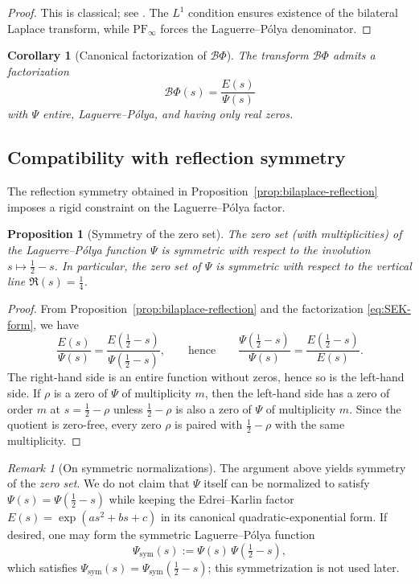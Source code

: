 \documentclass[12pt]{amsart}
\newtheorem{proposition}[theorem]{Proposition}
\newtheorem{corollary}[theorem]{Corollary}
\theoremstyle{definition}
\theoremstyle{remark}
\newtheorem{remark}[theorem]{Remark}
\begin{document}
\begin{proof}
This is classical; see \cite[Theorems~VII.1.3 and VII.3.2]{karlin1968total}.
The $L^1$ condition ensures existence of the bilateral Laplace transform,
while $\mathrm{PF}_\infty$ forces the Laguerre--Pólya denominator.
\end{proof}

\begin{corollary}[Canonical factorization of $\mathcal B\Phi$]
\label{cor:canonical-factorization}
The transform $\mathcal B\Phi$ admits a factorization
\[
\mathcal B\Phi(s)=\frac{E(s)}{\Psi(s)}
\]
with $\Psi$ entire, Laguerre--Pólya, and having only real zeros.
\end{corollary}

\subsection{Compatibility with reflection symmetry}

The reflection symmetry obtained in
Proposition~\ref{prop:bilaplace-reflection} imposes a rigid constraint on the
Laguerre--Pólya factor.

\begin{proposition}[Symmetry of the zero set]
\label{prop:Psi-symmetry}
The zero set (with multiplicities) of the Laguerre--P\'olya function $\Psi$ is symmetric with respect to
the involution $s\mapsto\tfrac12-s$. In particular, the zero set of $\Psi$ is symmetric with respect
to the vertical line $\Re(s)=\tfrac14$.
\end{proposition}

\begin{proof}
From Proposition~\ref{prop:bilaplace-reflection} and the factorization \eqref{eq:SEK-form}, we have
\[
\frac{E(s)}{\Psi(s)}
=
\frac{E(\tfrac12-s)}{\Psi(\tfrac12-s)},
\qquad\text{hence}\qquad
\frac{\Psi(\tfrac12-s)}{\Psi(s)}
=
\frac{E(\tfrac12-s)}{E(s)}.
\]
The right-hand side is an entire function without zeros, hence so is the left-hand side.
If $\rho$ is a zero of $\Psi$ of multiplicity $m$, then the left-hand side has a zero of order $m$ at
$s=\tfrac12-\rho$ unless $\tfrac12-\rho$ is also a zero of $\Psi$ of multiplicity $m$.
Since the quotient is zero-free, every zero $\rho$ is paired with $\tfrac12-\rho$ with the same multiplicity.
\end{proof}

\begin{remark}[On symmetric normalizations]
The argument above yields symmetry of the \emph{zero set}. We do not claim that $\Psi$ itself can be normalized
to satisfy $\Psi(s)=\Psi(\tfrac12-s)$ while keeping the Edrei--Karlin factor $E(s)=\exp(as^2+bs+c)$ in its canonical
quadratic-exponential form. If desired, one may form the symmetric Laguerre--P\'olya function
\[
\Psi_{\mathrm{sym}}(s):=\Psi(s)\,\Psi(\tfrac12-s),
\]
which satisfies $\Psi_{\mathrm{sym}}(s)=\Psi_{\mathrm{sym}}(\tfrac12-s)$; this symmetrization is not used later.
\end{remark}
\end{document}
